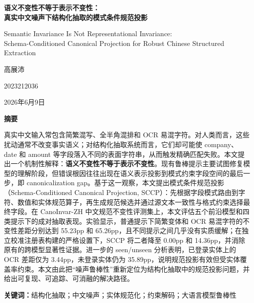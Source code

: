 ﻿\documentclass[UTF8,11pt,a4paper]{ctexart}
\newcommand{\method}{SCCP}
\newcommand{\dataset}{CanoInvar-ZH}
\newcommand{\pp}{pp}
\newcommand{\papertitlecn}{语义不变性不等于表示不变性：\\真实中文噪声下结构化抽取的模式条件规范投影}
\newcommand{\papertitleen}{Semantic Invariance Is Not Representational Invariance:\\Schema-Conditioned Canonical Projection for Robust Chinese Structured Extraction}
\newcommand{\paperauthor}{高展沛}
\newcommand{\paperid}{2023212036}
\newcommand{\paperdate}{2026年6月9日}
\begin{document}
\hypersetup{pageanchor=false}

\begin{titlepage}
  \centering
  \vspace*{2.8cm}
  {\LARGE\bfseries \papertitlecn\par}
  \vspace{0.55cm}
  {\large \papertitleen\par}
  \vspace{3.0cm}
  {\large \paperauthor\par}
  \vspace{0.25cm}
  {\large \paperid\par}
  \vfill
  {\large \paperdate\par}
\end{titlepage}

\clearpage
\begin{center}
  {\Large\bfseries 摘要}
\end{center}
\vspace{0.55cm}
\begin{center}
\begin{minipage}{0.88\linewidth}
真实中文输入常包含简繁混写、全半角混排和 OCR 易混字符。对人类而言，这些扰动通常不改变事实语义；对结构化抽取系统而言，它们却可能使 company、date 和 amount 等字段落入不同的表面字符串，从而触发精确匹配失败。本文提出一个机制性解释：\textbf{语义不变性不等于表示不变性}。现有鲁棒提示主要试图修复模型的理解阶段，但错误根因往往出现在语义表示投影到模式约束字段空间的最后一步，即 canonicalization gap。基于这一观察，本文提出模式条件规范投影（Schema-Conditioned Canonical Projection, \method{}）：先根据字段模式路由到字符、数值和实体规范算子，再生成规范候选并通过源文本一致性与格式约束选择最终字段。在 \dataset{} 中文规范不变性评测集上，本文评估五个前沿模型和四类提示下的成对抽取表现。实验显示，普通提示下简繁变体和 OCR 易混字符的不变性差距分别达到 55.23\pp{} 和 65.26\pp{}，且不同提示之间几乎没有实质缓解；在独立校准注册表构建的严格设置下，\method{} 将二者降至 0.00\pp{} 和 14.36\pp{}，并消除原有的跨模型显著性证据。进一步的 seen/unseen 分析表明，已登录实体上的 OCR 差距仅为 3.44\pp{}，未登录实体仍为 35.89\pp{}，说明规范投影有效但受实体覆盖率约束。本文由此把“噪声鲁棒性”重新定位为结构化抽取中的规范投影问题，并给出可复现、可追踪、可消融的解决路径。

\vspace{0.75cm}
\noindent\textbf{关键词：}结构化抽取；中文噪声；实体规范化；约束解码；大语言模型鲁棒性
\end{minipage}
\end{center}
\end{document}
